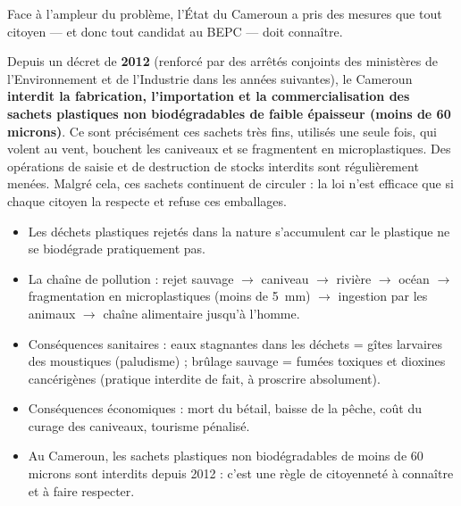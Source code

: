 \documentclass[11pt]{article}
\newcommand{\cle}[1]{{\popxbold\color{popdark}#1}}
\newcounter{popsec}
\newcounter{popsub}
\newcommand{\courssub}[1]{%
  \stepcounter{popsub}%
  \par\vspace{9pt}\noindent{\popxbold\fontsize{11.5}{13}\selectfont\color{popink}{\color{poporange}\thepopsec.\thepopsub}\hspace{6pt}#1}\par\nopagebreak\vspace{4pt}
}
\begin{document}
\courssub{Le cadre légal : un savoir citoyen}

Face à l'ampleur du problème, l'État du Cameroun a pris des mesures que tout citoyen — et donc tout candidat au BEPC — doit connaître.

\begin{savaistu}
Depuis un décret de \textbf{2012} (renforcé par des arrêtés conjoints des ministères de l'Environnement et de l'Industrie dans les années suivantes), le Cameroun \textbf{interdit la fabrication, l'importation et la commercialisation des sachets plastiques non biodégradables de faible épaisseur (moins de 60 microns)}. Ce sont précisément ces sachets très fins, utilisés une seule fois, qui volent au vent, bouchent les caniveaux et se fragmentent en microplastiques. Des opérations de saisie et de destruction de stocks interdits sont régulièrement menées. Malgré cela, ces sachets continuent de circuler : la loi n'est efficace que si chaque citoyen la respecte et refuse ces emballages.
\end{savaistu}

\begin{aretenir}
\begin{itemize}
\item Les déchets plastiques rejetés dans la nature s'accumulent car le plastique ne se biodégrade pratiquement pas.
\item La chaîne de pollution : rejet sauvage $\rightarrow$ caniveau $\rightarrow$ rivière $\rightarrow$ océan $\rightarrow$ fragmentation en \cle{microplastiques} (moins de \SI{5}{mm}) $\rightarrow$ ingestion par les animaux $\rightarrow$ chaîne alimentaire jusqu'à l'homme.
\item Conséquences sanitaires : eaux stagnantes dans les déchets = gîtes larvaires des moustiques (paludisme) ; brûlage sauvage = fumées toxiques et dioxines cancérigènes (pratique interdite de fait, à proscrire absolument).
\item Conséquences économiques : mort du bétail, baisse de la pêche, coût du curage des caniveaux, tourisme pénalisé.
\item Au Cameroun, les sachets plastiques non biodégradables de moins de 60 microns sont interdits depuis 2012 : c'est une règle de citoyenneté à connaître et à faire respecter.
\end{itemize}
\end{aretenir}
\end{document}
